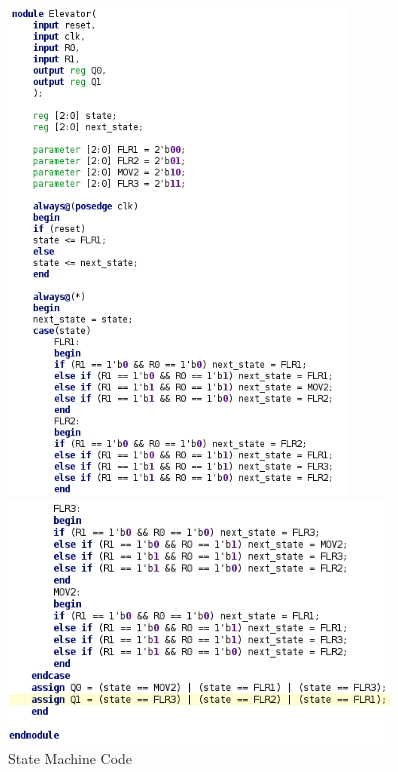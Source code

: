 \documentclass[12pt]{article}
\begin{document}
    \begin{figure}[h]
        \begin{minipage}{.5\textwidth}
            \centering
            \includegraphics[width=0.8\textwidth]{State Machine Code 1.png}
        \end{minipage}
        \begin{minipage}{.5\textwidth}
            \centering
            \includegraphics[width=0.9\textwidth]{State Machine Code 2.png}
        \end{minipage}
        \caption{State Machine Code}
    \end{figure}
\end{document}
